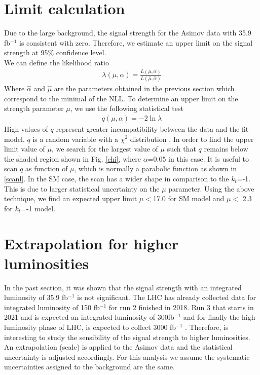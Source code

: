 	\pagebreak
	\section{Limit calculation}
	Due to the large background, the signal strength for the Asimov data with 35.9 fb$^{-1}$ is consistent with zero.
	Therefore, we estimate an upper limit on the signal strength at 95$\%$  confidence level.\\
	
	We can define the likelihood ratio
	\begin{align}
		\lambda(\mu,\alpha)=\frac{L(\mu,\alpha)}{L(\hat{\mu},\hat{\alpha})}
	\end{align}
	Where $\hat{\alpha}$ and $\hat{\mu}$ are the parameters obtained in the previous section which correspond to the minimal of the NLL.
	To determine an upper limit on the strength parameter $\mu$, we use the following statistical test
	\begin{align}
		q(\mu,\alpha)= -2\ln{\lambda} 
	\end{align}
	High values of $q$ represent greater incompatibility between the data and the fit model.
	$q$ is a random variable with a $\chi^2$ distribution \cite{asimov}.
	In order to find the upper limit value of $\mu$, we search for the largest value of $\mu$  such that $q$ remains below the shaded region shown in Fig. \ref{chi}, where $\alpha$=0.05 in this case. 
	It is useful to scan $q$ as function of $\mu$, which is normally a parabolic function as shown in \ref{scanl}. In the SM case, the scan has a wider shape in comparison to the $k_t$=-1. This is due to larger statistical uncertainty on the $\mu$ parameter. 
	Using the above technique, we find an expected upper limit $\mu < $17.0 for SM model and $\mu < $ 2.3 for $k_t$=-1 model. 
	
	
	
	
	\section{Extrapolation for higher luminosities}
	In the past section, it was shown that the signal strength  with an integrated luminosity of 35.9 fb$^{-1}$ is not significant. The LHC has already collected data for integrated luminosity of 150 fb$^{-1}$ for run 2 finished in 2018. Run 3 that starts in 2021 and is expected an integrated luminosity of 300fb$^{-1}$ and for finally the high luminosity phase of LHC, is expected to collect 3000 fb$^{-1}$ . Therefore, is interesting to study the sensibility of the signal  strength to higher luminosities. 
	An extrapolation (scale) is applied to the Asimov data and the statistical uncertainty is adjusted accordingly. For this analysis we assume the systematic uncertainties assigned to the background are the same.
	\\
	

